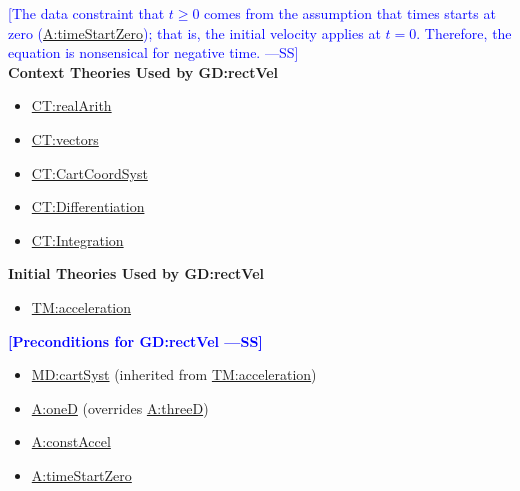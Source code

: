 \documentclass[12pt]{article}
\newcommand{\authornote}[3]{\textcolor{#1}{[#3 ---#2]}}
\newcommand{\authornote}[3]{}
\newcommand{\wss}[1]{\authornote{blue}{SS}{#1}}
\begin{document}
\wss{The data constraint that $t \geq 0$ comes from the assumption that times
starts at zero (\hyperref[timeStartZero]{A:timeStartZero}); that is, the initial
velocity applies at $t=0$.  Therefore, the equation is nonsensical for
negative time.}
~\\

\noindent \textbf{Context Theories Used by GD:rectVel}

\begin{itemize}
\item \hyperref[CT:realArith]{CT:realArith}
\item \hyperref[CT:vectors]{CT:vectors}
\item \hyperref[CT:CartCoordSyst]{CT:CartCoordSyst}
\item \hyperref[CT:Differentiation]{CT:Differentiation}
\item \hyperref[CT:Integration]{CT:Integration}
\end{itemize}

\noindent \textbf{Initial Theories Used by GD:rectVel}

\begin{itemize}
\item \hyperref[TM:acceleration]{TM:acceleration}
\end{itemize}

\noindent \textbf{\wss{Preconditions for GD:rectVel}}

\begin{itemize}
\item \hyperref[MD:cartSyst]{MD:cartSyst} (inherited from \hyperref[TM:acceleration]{TM:acceleration})
\item \hyperref[oneD]{A:oneD} (overrides \hyperref[threeD]{A:threeD})
\item \hyperref[constAccel]{A:constAccel}
\item \hyperref[timeStartZero]{A:timeStartZero}
\end{itemize}
\end{document}
